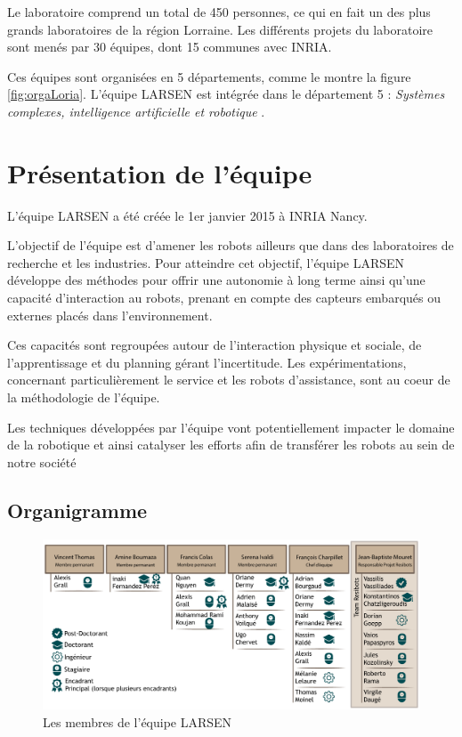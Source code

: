 \documentclass{tnreport}
\begin{document}
Le laboratoire comprend un total de 450 personnes, ce qui en fait un des plus grands laboratoires de la région Lorraine. Les différents projets du laboratoire sont menés par 30 équipes, dont 15 communes avec \gls{INRIA}.

Ces équipes sont organisées en 5 départements, comme le montre la figure \ref{fig:orgaLoria}. L'équipe \gls{LARSEN} est intégrée dans le département 5 : \textit{  Systèmes complexes, intelligence  
  artificielle et robotique }.
\section{Présentation de l'équipe}\label{lb:larsen}

L'équipe \gls{LARSEN} a été créée le 1er janvier 2015 à \gls{INRIA} Nancy.

L'objectif de l'équipe est d'amener les robots ailleurs que dans des laboratoires de recherche et les industries. Pour atteindre cet objectif, l'équipe \gls{LARSEN} développe des méthodes pour offrir une autonomie à long terme ainsi qu'une capacité d'interaction au robots, prenant en compte des capteurs embarqués ou externes placés dans l'environnement.

Ces capacités sont regroupées autour de l'interaction physique et sociale, de l'apprentissage et du planning gérant l'incertitude. Les expérimentations, concernant particulièrement le service et les robots d'assistance, sont au coeur de la méthodologie de l'équipe. 

Les techniques développées par l'équipe vont potentiellement impacter le domaine de la robotique et ainsi catalyser les efforts afin de transférer les robots au sein de notre société 
\subsection{Organigramme}
\begin{figure}[h]
    \centering
    \includegraphics[width = 17.5cm]{figures/team}
    \caption{Les membres de l'équipe LARSEN}
    \label{fig:team}
\end{figure}
\end{document}
